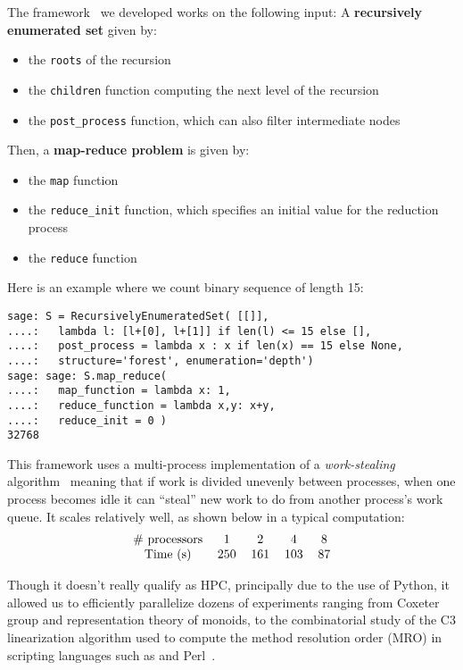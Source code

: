 \documentclass{deliverablereport}
\begin{document}
The framework~\cite{map-reduce} we developed works on the following input:
A \textbf{recursively enumerated set} given by:
\begin{itemize}
\item the \texttt{roots} of the recursion
\item the \texttt{children} function computing the next level of the recursion
\item the \texttt{post\_process} function, which can also filter intermediate nodes
\end{itemize}
Then, a \textbf{map-reduce problem} is given by:
\begin{itemize}
\item the \texttt{map} function
\item the \verb|reduce_init| function, which specifies an initial value for
    the reduction process
\item the \texttt{reduce} function
\end{itemize}
Here is an example where we count binary sequence of length 15:
\begin{verbatim}
sage: S = RecursivelyEnumeratedSet( [[]],
....:   lambda l: [l+[0], l+[1]] if len(l) <= 15 else [],
....:   post_process = lambda x : x if len(x) == 15 else None,
....:   structure='forest', enumeration='depth') 
sage: sage: S.map_reduce(
....:   map_function = lambda x: 1,
....:   reduce_function = lambda x,y: x+y,
....:   reduce_init = 0 )
32768
\end{verbatim}
This framework uses a multi-process implementation of a {\em work-stealing}
algorithm~\cite{BlumofeL99, BlumofeL99} meaning that if work is divided
unevenly between processes, when one process becomes idle it can ``steal'' new
work to do from another process's work queue.  It scales relatively well, as
shown below in a typical computation:
\[\begin{tabular}{ccccc}
\# processors & 1 & 2 & 4 & 8 \\
Time (s) & 250& 161& 103 & 87 \\
\end{tabular}
\]

Though it doesn't really qualify as HPC, principally due to the use of Python,
it allowed us to efficiently parallelize dozens of experiments ranging from
Coxeter group and representation theory of monoids, to the combinatorial study
of the C3 linearization algorithm used to compute the method resolution order
(MRO) in scripting languages such as \Python and Perl~\cite{C3-controled}.
\end{document}
